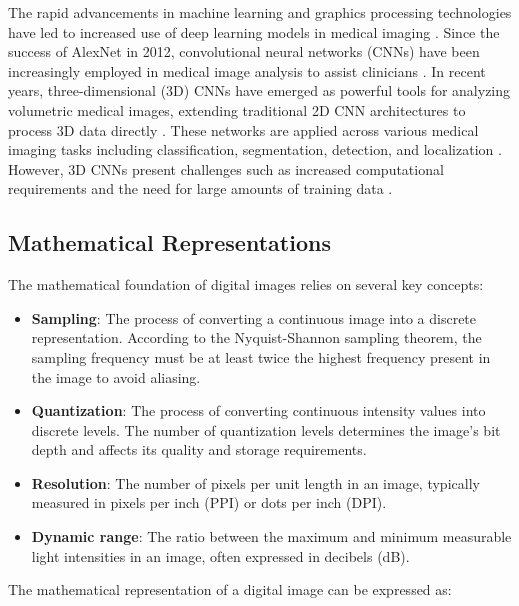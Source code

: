 The rapid advancements in machine learning and graphics processing
technologies have led to increased use of deep learning models in
medical imaging \cite{SinghEtAl2020}. Since the success of AlexNet in 2012,
convolutional neural networks (CNNs) have been increasingly employed
in medical image analysis to assist clinicians \cite{SinghEtAl2020}.
In recent years, three-dimensional (3D) CNNs have emerged as powerful tools
for analyzing volumetric medical images, extending traditional 2D
CNN architectures to process 3D data directly \cite{SinghEtAl2020}.
These networks are applied across various medical imaging tasks including
classification, segmentation, detection, and localization \cite{SinghEtAl2020}.
However, 3D CNNs present challenges such as increased computational
requirements and the need for large amounts of training data
\cite{SinghEtAl2020}.

\subsection{Mathematical Representations}

The mathematical foundation of digital images relies on several key
concepts:

\begin{itemize}
  \item \textbf{Sampling}: The process of converting a continuous
    image into a discrete representation. According to the
    Nyquist-Shannon sampling theorem, the sampling frequency must be
    at least twice the highest frequency present in the image to
    avoid aliasing.

  \item \textbf{Quantization}: The process of converting continuous
    intensity values into discrete levels. The number of quantization
    levels determines the image's bit depth and affects its quality
    and storage requirements.

  \item \textbf{Resolution}: The number of pixels per unit length in
    an image, typically measured in pixels per inch (PPI) or dots per
    inch (DPI).

  \item \textbf{Dynamic range}: The ratio between the maximum and
    minimum measurable light intensities in an image, often expressed
    in decibels (dB).
\end{itemize}

The mathematical representation of a digital image can be expressed as:

